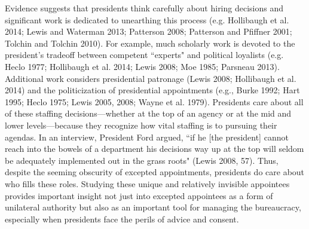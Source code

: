 \documentclass[12pt]{article}
\begin{document}
	Evidence suggests that presidents think carefully about hiring decisions and significant work is dedicated to unearthing this process (e.g. Hollibaugh et al. 2014; Lewis and Waterman 2013; Patterson 2008; Patterson and Pfiffner 2001; Tolchin and Tolchin 2010). For example, much scholarly work is devoted to the president's tradeoff between competent ``experts" and political loyalists (e.g. Heclo 1977; Hollibaugh et al. 2014; Lewis 2008; Moe 1985; Parsneau 2013). Additional work considers presidential patronage (Lewis 2008; Hollibaugh et al. 2014) and the politicization of presidential appointments (e.g., Burke 1992; Hart 1995; Heclo 1975; Lewis 2005, 2008; Wayne et al. 1979). Presidents care about all of these staffing decisions---whether at the top of an agency or at the mid and lower levels---because they recognize how vital staffing is to pursuing their agendas. In an interview, President Ford argued, ``if he [the president] cannot reach into the bowels of a department his decisions way up at the top will seldom be adequately implemented out in the grass roots" (Lewis 2008, 57). Thus, despite the seeming obscurity of excepted appointments, presidents do care about who fills these roles. Studying these unique and relatively invisible appointees provides important insight not just into excepted appointees as a form of unilateral authority but also as an important tool for managing the bureaucracy, especially when presidents face the perils of advice and consent. 
	

	
\end{document}

